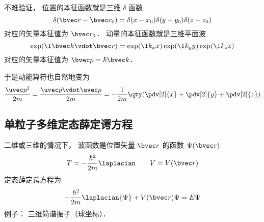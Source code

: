 不难验证， 位置的本征函数就是三维 $\delta$ 函数
\begin{equation}
\delta(\bvec r - \bvec r_0) = \delta(x - x_0) \delta(y - y_0) \delta(z - z_0)
\end{equation}
对应的矢量本征值为 $\bvec r_0$． 动量的本征函数就是三维平面波
\begin{equation}
\exp(\I \bvec k \vdot \bvec r) = \exp(\I k_x x) \exp(\I k_y y) \exp(\I k_z z)
\end{equation}
对应的矢量本征值为 $\bvec p = \hbar\bvec k$．

于是动能算符也自然地变为
\begin{equation}
\frac{\uvec p^2}{2m} = \frac{\uvec p \vdot \uvec p}{2m} = -\frac{1}{2m} \qty(\pdv[2]{x} + \pdv[2]{y} + \pdv[2]{z})
\end{equation}

\subsection{单粒子多维定态薛定谔方程}
二维或三维的情况下， 波函数是位置矢量 $\bvec r$ 的函数 $\Psi(\bvec r)$
\begin{equation}
T = -\frac{\hbar^2}{2m} \laplacian \qquad V = V(\bvec r)
\end{equation}
定态薛定谔方程为
\begin{equation}\label{QMndim_eq4}
-\frac{\hbar^2}{2m} \laplacian {\Psi} + V(\bvec r)\Psi = E \Psi
\end{equation}
例子： 三维简谐振子（球坐标）．
